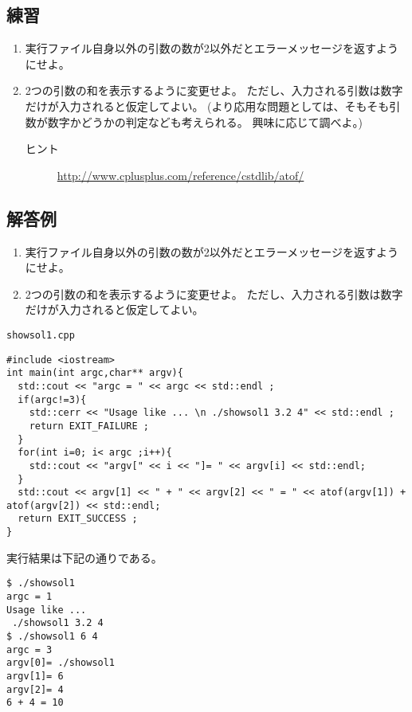 \subsection{練習}

\begin{enumerate}
 \item 実行ファイル自身以外の引数の数が2以外だとエラーメッセージを返すようにせよ。
       
 \item 2つの引数の和を表示するように変更せよ。
       ただし、入力される引数は数字だけが入力されると仮定してよい。
       (より応用な問題としては、そもそも引数が数字かどうかの判定なども考えられる。
       興味に応じて調べよ。)
       \begin{description}
	\item[ヒント] \url{http://www.cplusplus.com/reference/cstdlib/atof/}
       \end{description}
\end{enumerate}


\subsection{解答例}

\begin{enumerate}
 \item 実行ファイル自身以外の引数の数が2以外だとエラーメッセージを返すようにせよ。
       
 \item 2つの引数の和を表示するように変更せよ。
       ただし、入力される引数は数字だけが入力されると仮定してよい。
\end{enumerate}
\begin{itembox}{\texttt{showsol1.cpp}}
 \begin{verbatim}
#include <iostream>
int main(int argc,char** argv){
  std::cout << "argc = " << argc << std::endl ;
  if(argc!=3){
    std::cerr << "Usage like ... \n ./showsol1 3.2 4" << std::endl ;
    return EXIT_FAILURE ;
  }
  for(int i=0; i< argc ;i++){
    std::cout << "argv[" << i << "]= " << argv[i] << std::endl;
  }
  std::cout << argv[1] << " + " << argv[2] << " = " << atof(argv[1]) + atof(argv[2]) << std::endl;
  return EXIT_SUCCESS ;
}
 \end{verbatim}
\end{itembox}

実行結果は下記の通りである。
\begin{verbatim}
$ ./showsol1 
argc = 1
Usage like ... 
 ./showsol1 3.2 4
$ ./showsol1 6 4
argc = 3
argv[0]= ./showsol1
argv[1]= 6
argv[2]= 4
6 + 4 = 10
\end{verbatim}